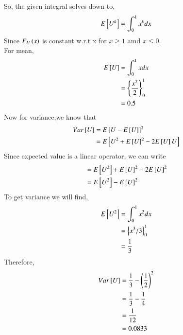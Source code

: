 \documentclass[journal,12pt,twocolumn]{IEEEtran}
\begin{document}
So, the given integral solves down to,
 \begin{equation}
	 E{}\left[U^k\right] = \int_{0}^{1}x^kdx
 \end{equation}
Since $F_{U}\left(x\right)$ is constant w.r.t x for $ x \geq 1 $ amd $ x \leq 0 $.\\
For mean,
  \begin{align}
	  E{}\left[U\right] &= \int_{0}^{1}xdx\\
	             &=\left\{ \frac{x^{2}}{2}\right\}_{0}^{1}\\ 
                     &= 0.5
  \end{align}
Now for variance,we know that
  \begin{align}
	  Var{}\left[U\right] &= E{}\left[U- E{}\left[U\right]\right]^2 \\
		       &= E{}\left[U^{2} + E{}\left[U\right]^{2} - 2E{}\left[U\right]U\right]\\
  \end{align}
  Since expected value is a linear operator, we can write
  \begin{align}
	               &= E{}\left[U^{2}\right] + E{}\left[U\right]^{2} - 2E{}\left[U\right]^{2}\\
                   &= E{}\left[U^{2}\right] - E{}\left[U\right]^{2} \label{eq:1-8}
  \end{align}
 To get variance we will find,
  \begin{align}
	  E{}\left[U^{2}\right] &= \int_{0}^{1}x^{2}dx\\
			 &=\left\{ x^{3}/3\right\}_{0}^{1}\\
			 &= \frac{1}{3}
  \end{align}
  Therefore,
  \begin{align}
	  Var{}\left[U\right] &= \frac{1}{3} -\left(\frac{1}{2}\right)^{2}\\
		       &= \frac{1}{3} - \frac{1}{4}\\
		       &= \frac{1}{12}\\
		       &= 0.0833
  \end{align}
\end{document}
